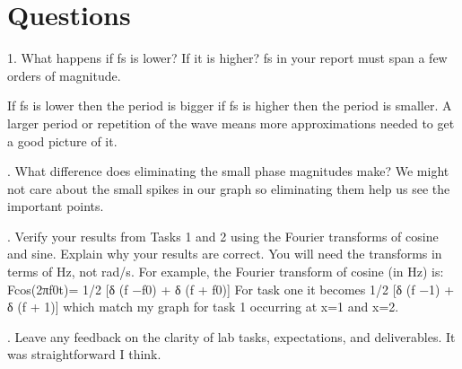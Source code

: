 \documentclass[12pt,a4paper]{article}
\begin{document}
\section{Questions}\label{sec:res}

1.  What happens if fs is lower? If it is higher? fs in your report must span a few orders of
magnitude. \newline

\noindent  If fs is lower then the period is bigger if fs is higher then the period is smaller. A larger period or repetition of the wave means more approximations needed to get a good picture of it.

. What difference does eliminating the small phase magnitudes make? \newline 
\noindent We might not care about the small spikes in our graph so eliminating them help us see the important points.

. Verify your results from Tasks 1 and 2 using the Fourier transforms of cosine and sine.
Explain why your results are correct. You will need the transforms in terms of Hz, not rad/s.
For example, the Fourier transform of cosine (in Hz) is:
F{cos(2πf0t)}= 1/2 [δ (f −f0) + δ (f + f0)]\newline
\noindent For task one it becomes 1/2 [δ (f −1) + δ (f + 1)] which match my graph for task 1 occurring at x=1 and x=2.



. Leave any feedback on the clarity of lab tasks, expectations, and deliverables. \newline
It was straightforward I think.






\end{document}

